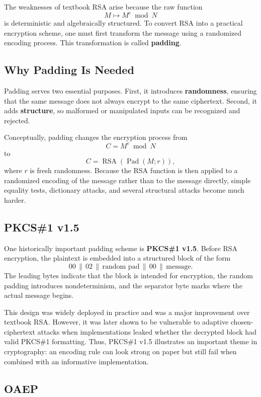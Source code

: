 The weaknesses of textbook RSA arise because the raw function
\[
M \mapsto M^e \bmod N
\]
is deterministic and algebraically structured. To convert RSA into a practical encryption scheme, one must first transform the message using a randomized encoding process. This transformation is called \textbf{padding}.

\subsection{Why Padding Is Needed}

Padding serves two essential purposes. First, it introduces \textbf{randomness}, ensuring that the same message does not always encrypt to the same ciphertext. Second, it adds \textbf{structure}, so malformed or manipulated inputs can be recognized and rejected.

Conceptually, padding changes the encryption process from
\[
C = M^e \bmod N
\]
to
\[
C = \operatorname{RSA}(\operatorname{Pad}(M;r)),
\]
where $r$ is fresh randomness. Because the RSA function is then applied to a randomized encoding of the message rather than to the message directly, simple equality tests, dictionary attacks, and several structural attacks become much harder.

\subsection{PKCS\#1 v1.5}

One historically important padding scheme is \textbf{PKCS\#1 v1.5}. Before RSA encryption, the plaintext is embedded into a structured block of the form
\[
00 \,\|\, 02 \,\|\, \text{random pad} \,\|\, 00 \,\|\, \text{message}.
\]
The leading bytes indicate that the block is intended for encryption, the random padding introduces nondeterminism, and the separator byte marks where the actual message begins.

This design was widely deployed in practice and was a major improvement over textbook RSA. However, it was later shown to be vulnerable to adaptive chosen-ciphertext attacks when implementations leaked whether the decrypted block had valid PKCS\#1 formatting. Thus, PKCS\#1 v1.5 illustrates an important theme in cryptography: an encoding rule can look strong on paper but still fail when combined with an informative implementation.

\subsection{OAEP}


